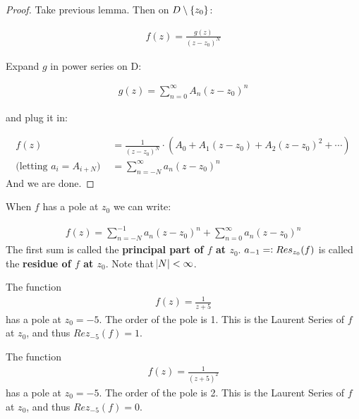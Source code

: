 \begin{proof}
Take previous lemma. Then on $D \setminus \{ z_0 \}$:

\begin{align*}
    f(z) = \frac{g(z)}{(z-z_0)^N} 
\end{align*}

Expand $g$ in power series on D:


\begin{align*}
g(z) = \sum_{n=0}^\infty A_n (z-z_0)^n
\end{align*}

and plug it in:

\begin{align*}
    f(z) &= \frac{1}{(z-z_0)^N} \cdot (A_0 + A_1(z-z_0) + A_2 (z-z_0)^2 + \cdots)\\
    \text{(letting $a_i = A_{i+N}$) } &= \sum_{n=-N}^\infty a_n (z-z_0)^n
\end{align*}
And we are done.
\end{proof}

\begin{definition}

When $f$ has a pole at $z_0$ we can write:

\begin{align*}
    f(z) = \sum_{n=-N}^{-1} a_n (z-z_0)^n + \sum_{n=0}^{\infty} a_n (z-z_0)^n
\end{align*}
The first sum is called the \textbf{principal part of $f$ at $z_0$}. $a_{-1} = \vcentcolon Res_{z_0} (f)$ is called the \textbf{residue of $f$ at $z_0$}. Note that $\abs{N} < \infty$.
\end{definition}

\begin{example}
The function
\begin{align*}
f(z) = \frac{1}{z+5}
\end{align*}
has a pole at $z_0 = -5$. The order of the pole is 1. This is the Laurent Series of $f$ at $z_0$, and thus $Rez_{-5}(f) = 1 $.
\end{example}



\begin{example}
The function
\begin{align*}
f(z) = \frac{1}{(z+5)^2}
\end{align*}
has a pole at $z_0 = -5$. The order of the pole is 2. This is the Laurent Series of $f$ at $z_0$, and thus $Rez_{-5}(f) = 0 $.
\end{example}



